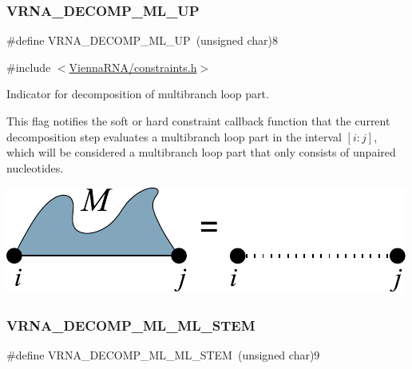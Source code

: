 \subsubsection{\texorpdfstring{V\+R\+N\+A\+\_\+\+D\+E\+C\+O\+M\+P\+\_\+\+M\+L\+\_\+\+UP}{VRNA\_DECOMP\_ML\_UP}}
{\footnotesize\ttfamily \#define V\+R\+N\+A\+\_\+\+D\+E\+C\+O\+M\+P\+\_\+\+M\+L\+\_\+\+UP~(unsigned char)8}



{\ttfamily \#include $<$\hyperlink{constraints_8h}{Vienna\+R\+N\+A/constraints.\+h}$>$}



Indicator for decomposition of multibranch loop part. 

This flag notifies the soft or hard constraint callback function that the current decomposition step evaluates a multibranch loop part in the interval $[i:j]$, which will be considered a multibranch loop part that only consists of unpaired nucleotides.

 
\begin{DoxyImageNoCaption}
  \mbox{\includegraphics[width=\textwidth,height=\textheight/2,keepaspectratio=true]{decomp_ml_up}}
\end{DoxyImageNoCaption}
 \mbox{\label{group__constraints_ga63d8ceb8c96ae3b463e529e28cc0fe98}} 
\subsubsection{\texorpdfstring{V\+R\+N\+A\+\_\+\+D\+E\+C\+O\+M\+P\+\_\+\+M\+L\+\_\+\+M\+L\+\_\+\+S\+T\+EM}{VRNA\_DECOMP\_ML\_ML\_STEM}}
{\footnotesize\ttfamily \#define V\+R\+N\+A\+\_\+\+D\+E\+C\+O\+M\+P\+\_\+\+M\+L\+\_\+\+M\+L\+\_\+\+S\+T\+EM~(unsigned char)9}



